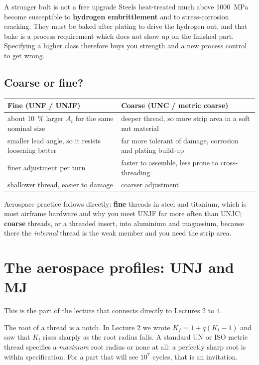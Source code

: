 \documentclass[11pt,a4paper]{article}
\begin{document}
\begin{keybox}{A stronger bolt is not a free upgrade}
Steels heat-treated much above \SI{1000}{MPa} become susceptible to \textbf{hydrogen embrittlement}
and to stress-corrosion cracking. They must be baked after plating to drive the hydrogen out, and that
bake is a process requirement which does not show up on the finished part. Specifying a higher class
therefore buys you strength and a new process control to get wrong.
\end{keybox}

\subsection{Coarse or fine?}

\begin{center}\small
\begin{tabular}{@{}p{6.4cm}p{6.4cm}@{}}
\toprule
\textbf{Fine} (UNF / UNJF) & \textbf{Coarse} (UNC / metric coarse)\\
\midrule
about \SI{10}{\percent} larger $A_t$ for the same nominal size
  & deeper thread, so more strip area in a soft nut material\\[3pt]
smaller lead angle, so it resists loosening better
  & far more tolerant of damage, corrosion and plating build-up\\[3pt]
finer adjustment per turn & faster to assemble, less prone to cross-threading\\[3pt]
shallower thread, easier to damage & coarser adjustment\\
\bottomrule
\end{tabular}
\end{center}

\medskip
Aerospace practice follows directly: \textbf{fine} threads in steel and titanium, which is most
airframe hardware and why you meet UNJF far more often than UNJC; \textbf{coarse} threads, or a
threaded insert, into aluminium and magnesium, because there the \emph{internal} thread is the weak
member and you need the strip area.

\section{The aerospace profiles: UNJ and MJ}

This is the part of the lecture that connects directly to Lectures 2 to 4.

The root of a thread is a notch. In Lecture 2 we wrote $K_f = 1 + q(K_t-1)$ and saw that $K_t$ rises
sharply as the root radius falls. A standard UN or ISO metric thread specifies a \emph{maximum} root
radius or none at all: a perfectly sharp root is within specification. For a part that will see
$10^7$ cycles, that is an invitation.
\end{document}
